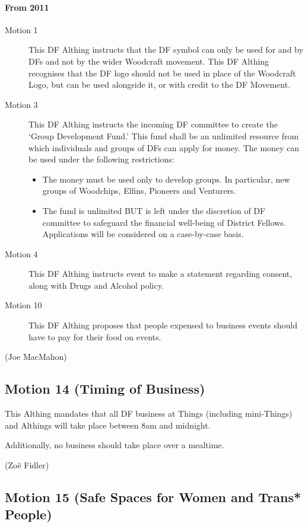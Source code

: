 \documentclass[a4paper, 11pt]{article} %
\begin{document}
\paragraph{From 2011}
\begin{description}
\item[Motion 1]  This DF Althing instructs that the DF symbol can only be used for and by DFs and not by the wider Woodcraft movement. This DF Althing recognises that the DF logo should not be used in place of the Woodcraft Logo, but can be used alongside it, or with credit to the DF Movement.

\item[Motion 3]  This DF Althing instructs the incoming DF committee to create the `Group Development Fund.' This fund shall be an unlimited resource from which individuals and groups of DFs can apply for money. The money can be used under the following restrictions:
	\begin{itemize}
	\item The money must be used only to develop groups. In particular, new groups of Woodchips, Elfins, Pioneers and Venturers. 
	\item The fund is unlimited BUT is left under the discretion of DF committee to safeguard the financial well-being of District Fellows. Applications will be considered on a case-by-case basis.
	\end{itemize}

\item[Motion 4]  This DF Althing instructs event to make a statement regarding consent, along with Drugs and Alcohol policy.

\item[Motion 10]  This DF Althing proposes that people expensed to business events should have to pay for their food on events.
\end{description}

(Joe MacMahon)

\subsection{Motion 14 (Timing of Business)}

This Althing mandates that all DF business at Things (including
mini-Things) and Althings will take place between 8am and midnight.

Additionally, no business should take place over a mealtime.

(Zoë Fidler)

\subsection{Motion 15 (Safe Spaces for Women and Trans* People)}
\end{document}
